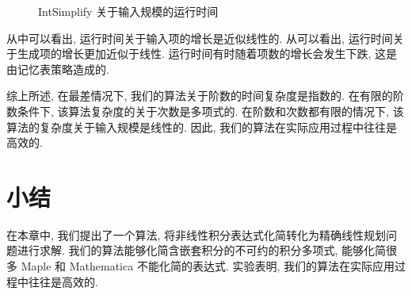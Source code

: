 \begin{figure}[htb]
\centering
{}
\caption{IntSimplify 关于输入规模的运行时间}
\label{items_all}
\end{figure}

从中可以看出, 运行时间关于输入项的增长是近似线性的. 从可以看出, 运行时间关于生成项的增长更加近似于线性. 运行时间有时随着项数的增长会发生下跌, 这是由记忆表策略造成的. 

综上所述, 在最差情况下, 我们的算法关于阶数的时间复杂度是指数的. 在有限的阶数条件下, 该算法复杂度的关于次数是多项式的. 在阶数和次数都有限的情况下, 该算法的复杂度关于输入规模是线性的. 因此, 我们的算法在实际应用过程中往往是高效的.  

\section{小结} \label{Conclusion-03} 
在本章中, 我们提出了一个算法, 将非线性积分表达式化简转化为精确线性规划问题进行求解. 我们的算法能够化简含嵌套积分的不可约的积分多项式, 能够化简很多 Maple 和 Mathematica 不能化简的表达式. 实验表明, 我们的算法在实际应用过程中往往是高效的.  
